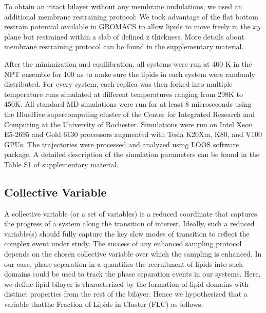 \documentclass{biophys-new}
\begin{document}
To obtain an intact bilayer without any membrane undulations, we used an additional membrane restraining protocol: 
We took advantage of the flat bottom restrain potential available in GROMACS to allow lipids to move freely in the $xy$ plane but restrained within a slab of
defined z thickness.
More details about membrane restraining protocol can be found in the supplementary material.

After the minimization and equilibration, all systems were run at 400 K in the NPT ensemble for 100 ns to make sure the lipids in each system were
randomly distributed.
For every system, each replica was then forked into multiple temperature runs simulated at different temperatures ranging from 298K to 450K. 
All standard MD simulations were run for at least 8 microseconds using the BlueHive supercomputing cluster of the Center for Integrated Research and
Computing at the University of Rochester. Simulations were run on Intel Xeon E5-2695 and Gold 6130 processors augmented with Tesla K20Xm, K80, and V100 GPUs.   
The trajectories were processed and analyzed using LOOS software package.
A detailed description of the simulation parameters can be found in the Table S1 of supplementary material.  

\subsection*{Collective Variable}

A collective variable (or a set of variables) is a reduced coordinate that captures the progress of a system along the transition of interest.
Ideally, such a reduced variable(s) should fully capture the key slow modes of transition to reflect the complex event under study.
The success of any enhanced sampling protocol depends on the chosen collective variable over which the sampling is enhanced. 
In our case, phase separation in a  quantifies the recruitment of lipids into such domains could be used to track the phase separation
events in our systems. Here, we define lipid bilayer is characterized by the formation of lipid domains with distinct properties from the rest of the bilayer.
Hence we hypothesized that a variable thatthe Fraction of Lipids in Cluster (FLC) as follows:
\end{document}
